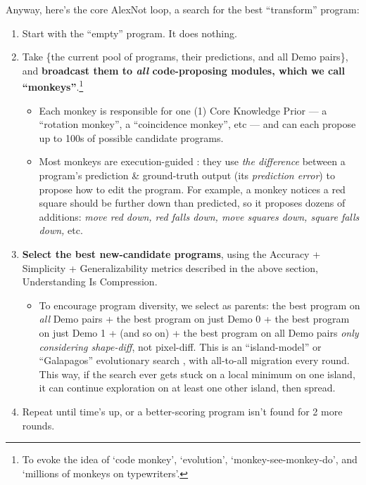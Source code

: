 \documentclass[11pt]{article}
\begin{document}
Anyway, here's the core AlexNot loop, a search for the best ``transform'' program:

\begin{enumerate}
    \item Start with the ``empty'' program. It does nothing.
    \item Take \{the current pool of programs, their predictions, and all Demo pairs\}, and \textbf{broadcast them to \textit{all} code-proposing modules, which we call ``monkeys''}.\footnote{To evoke the idea of `code monkey', `evolution', `monkey-see-monkey-do', and `millions of monkeys on typewriters'.}
    \begin{itemize}
        \item Each monkey is responsible for one (1) Core Knowledge Prior — a ``rotation monkey'', a ``coincidence monkey'', etc — and can each propose up to 100s of possible candidate programs.
        \item Most monkeys are execution-guided \citep{execution_guided}: they use \textit{the difference} between a program's prediction \& ground-truth output (its \textit{prediction error}) to propose how to edit the program. For example, a monkey notices a red square should be further down than predicted, so it proposes dozens of additions: \textit{move red down, red falls down, move squares down, square falls down,} etc.
    \end{itemize}
    \item \textbf{Select the best new-candidate programs}, using the Accuracy + Simplicity + Generalizability metrics described in the above section, Understanding Is Compression.
    \begin{itemize}
        \item To encourage program diversity, we select as parents: the best program on \textit{all} Demo pairs + the best program on just Demo 0 + the best program on just Demo 1 + (and so on) + the best program on all Demo pairs \textit{only considering shape-diff}, not pixel-diff. This is an ``island-model'' or ``Galapagos'' evolutionary search \citep{island_model}, with all-to-all migration every round. This way, if the search ever gets stuck on a local minimum on one island, it can continue exploration on at least one other island, then spread.
    \end{itemize}
    \item Repeat until time's up, or a better-scoring program isn't found for 2 more rounds.
\end{enumerate}
\end{document}
